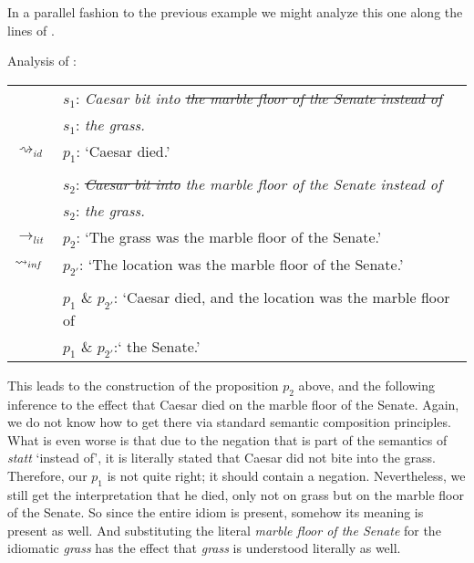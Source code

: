 \documentclass[output=paper]{langsci/langscibook}
\begin{document}
\noindent In a parallel fashion to the previous example we might analyze this one along the lines of .

\ea \label{analysis marble floor} 
Analysis of : \\
\vspace{5pt}
\begin{tabular}{ll}
								& 	$s_{1}$: \hspace{4pt} \textit{Caesar bit into \sout{the marble floor of the Senate instead of}} \\
								&	{\white $s_{1}$:} \hspace{4pt} \textit{the grass.} \\
$\rightsquigarrow_{id}$				&	$p_{1}$: \hspace{1pt} `Caesar died.' \\
\vspace{-5pt} \\
								& 	$s_{2}$: \hspace{4pt} \textit{\sout{Caesar bit into} the marble floor of the Senate instead of} \\
								&	{\white $s_{2}$:} \hspace{4pt} \textit{the grass.} \\
$\rightarrow_{lit}$					&	$p_{2}$: \hspace{1pt} `The grass was the marble floor of the Senate.' \\
$\rightsquigarrow_{in\hspace{-0.8pt} f}$	&	$p_{2'}$: \hspace{-1.5pt} `The location was the marble floor of the Senate.' \\
\vspace{-5pt} \\
								&	$p_{1}$ \& $p_{2'}$: `Caesar died, and the location was the marble floor of \\
								&	{\white $p_{1}$ \& $p_{2'}$:`} the Senate.' 
\end{tabular}
\z

\noindent This leads to the construction of the proposition $p_{2}$ above, and the following inference to the effect that Caesar died on the marble floor of the Senate. Again, we do not know how to get there via standard semantic composition principles. What is even worse %
is that due to the negation that is part of the semantics of \textit{statt} `instead of', it is literally stated that Caesar did not bite into the grass. Therefore, our $p_{1}$ is not quite right; it should contain a negation. Nevertheless, we still get the interpretation that he died, only not on grass but on the marble floor of the Senate. So since the entire idiom is present, somehow its meaning is present as well. And substituting the literal \textit{marble floor of the Senate} for the idiomatic \textit{grass} has the effect that \textit{grass} is understood literally as well.
\end{document}

